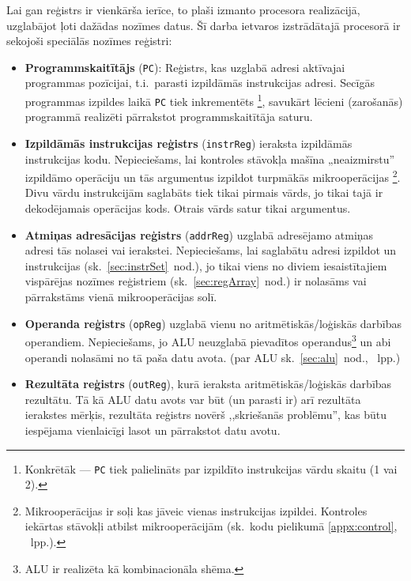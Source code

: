 	\pagebreak[2]
	Lai gan reģistrs ir vienkārša ierīce, to plaši izmanto procesora
	realizācijā, uzglabājot ļoti dažādas nozīmes datus.
	Šī darba ietvaros izstrādātajā procesorā ir sekojoši speciālās nozīmes reģistri:
	\pagebreak[1]
	\begin{itemize}
		\item \textbf{Programmskaitītājs} (\texttt{PC}):
			Reģistrs, kas uzglabā adresi aktīvajai programmas pozīcijai,
			t.i.~parasti izpildāmās instrukcijas adresi. Secīgās programmas
			izpildes laikā \texttt{PC} tiek inkrementēts%
			\footnote{Konkrētāk — \texttt{PC} tiek palielināts par
				izpildīto instrukcijas vārdu skaitu (1 vai 2).},
			savukārt lēcieni (zarošanās)
			programmā realizēti pārrakstot programmskaitītāja saturu.\pagebreak[2]
		\item \textbf{Izpildāmās instrukcijas reģistrs} (\texttt{instrReg})
			ieraksta izpildāmās instrukcijas kodu.
			Nepieciešams, lai kontroles stāvokļa mašīna „neaizmirstu”
			izpildāmo operāciju un tās argumentus izpildot
			turpmākās mikro\-operācijas%
			\footnote{Mikrooperācijas ir soļi kas jāveic vienas instrukcijas
				izpildei. Kontroles iekārtas stāvokļi atbilst mikrooperācijām
				(sk.~kodu pielikumā \ref{appx:control}, \pageref{appx:control}~lpp.).}.
			Divu vārdu instrukcijām saglabāts
			tiek tikai pirmais vārds, jo tikai tajā ir dekodējamais
			operācijas kods. Otrais vārds satur tikai argumentus.
		\item \textbf{Atmiņas adresācijas reģistrs} (\texttt{addrReg})
			uzglabā adresējamo atmiņas adresi tās nolasei
			vai ierakstei. Nepieciešams, lai saglabātu adresi izpildot
			 un  instrukcijas (sk.~\ref{sec:instrSet}~nod.),
			jo tikai viens no diviem iesaistītajiem vispārējas nozīmes reģistriem
			(sk.~\ref{sec:regArray}~nod.) ir nolasāms vai pārrakstāms
			vienā mikrooperācijas solī.
		\item \textbf{Operanda reģistrs} (\texttt{opReg})
			uzglabā vienu no aritmētiskās/loģiskās darbības
			ope\-ran\-diem. Nepieciešams, jo ALU neuzglabā pievadītos
			operandus\footnote{ALU ir realizēta kā kombinacionāla shēma.}
			un abi operandi nolasāmi no tā paša datu avota.
			(par ALU sk.~\ref{sec:alu}~nod., \pageref{sec:alu}~lpp.)
		\item \textbf{Rezultāta reģistrs} (\texttt{outReg}),
			kurā ieraksta aritmētiskās/loģiskās darbības rezultātu.
			Tā kā ALU datu avots var būt (un parasti ir) arī rezultāta
			ierakstes mērķis, rezultāta reģistrs novērš 
			,,skriešanās problēmu'', kas būtu
			iespējama vienlaicīgi lasot un pārrakstot datu avotu.
	\end{itemize}

